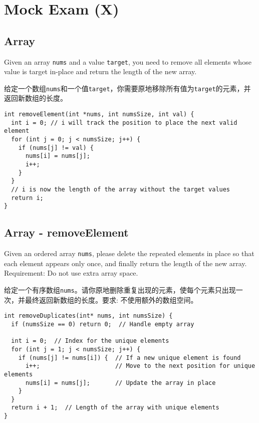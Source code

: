 \documentclass[a4paper]{article}
\begin{document}
\section{Mock Exam (X)}

\subsection{Array}

Given an array \verb|nums| and a value \verb|target|, you need to remove all elements whose value is target in-place and return the length of the new array.

给定一个数组\verb|nums|和一个值\verb|target|，你需要原地移除所有值为\verb|target|的元素，并返回新数组的长度。

\begin{verbatim}
int removeElement(int *nums, int numsSize, int val) {
  int i = 0; // i will track the position to place the next valid element
  for (int j = 0; j < numsSize; j++) {
    if (nums[j] != val) {
      nums[i] = nums[j];
      i++;
    }
  }
  // i is now the length of the array without the target values
  return i;
}
\end{verbatim}

\subsection{Array - removeElement}

Given an ordered array \verb|nums|, please delete the repeated elements in place so that each element appears only once, and finally return the length of the new array. Requirement: Do not use extra array space.

给定一个有序数组\verb|nums|。请你原地删除重复出现的元素，使每个元素只出现一次，并最终返回新数组的长度。要求: 不使用额外的数组空间。

\begin{verbatim}
int removeDuplicates(int* nums, int numsSize) {
  if (numsSize == 0) return 0;  // Handle empty array

  int i = 0;  // Index for the unique elements
  for (int j = 1; j < numsSize; j++) {
    if (nums[j] != nums[i]) {  // If a new unique element is found
      i++;                     // Move to the next position for unique elements
      nums[i] = nums[j];       // Update the array in place
    }
  }
  return i + 1;  // Length of the array with unique elements
}
\end{verbatim}
\end{document}
